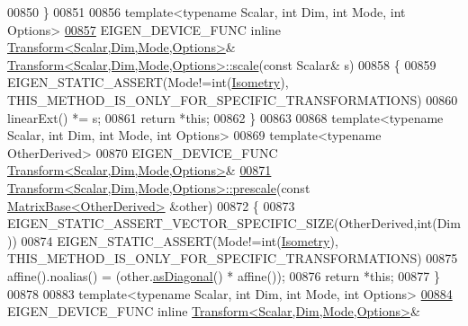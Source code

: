 \begin{DoxyCode}
00850 \}
00851 
00856 \textcolor{keyword}{template}<\textcolor{keyword}{typename} Scalar, \textcolor{keywordtype}{int} Dim, \textcolor{keywordtype}{int} Mode, \textcolor{keywordtype}{int} Options>
\hyperlink{group___geometry___module_a7c4f178cd06d8352607a79804e23d275}{00857} EIGEN\_DEVICE\_FUNC \textcolor{keyword}{inline} \hyperlink{group___geometry___module_class_eigen_1_1_transform}{Transform<Scalar,Dim,Mode,Options>}& 
      \hyperlink{group___geometry___module_class_eigen_1_1_transform}{Transform<Scalar,Dim,Mode,Options>::scale}(\textcolor{keyword}{const} Scalar& s)
00858 \{
00859   EIGEN\_STATIC\_ASSERT(Mode!=\textcolor{keywordtype}{int}(\hyperlink{group__enums_ggaee59a86102f150923b0cac6d4ff05107a080cd5366173608f701cd945c2335568}{Isometry}), THIS\_METHOD\_IS\_ONLY\_FOR\_SPECIFIC\_TRANSFORMATIONS)
00860   linearExt() *= s;
00861   \textcolor{keywordflow}{return} *\textcolor{keyword}{this};
00862 \}
00863 
00868 \textcolor{keyword}{template}<\textcolor{keyword}{typename} Scalar, \textcolor{keywordtype}{int} Dim, \textcolor{keywordtype}{int} Mode, \textcolor{keywordtype}{int} Options>
00869 \textcolor{keyword}{template}<\textcolor{keyword}{typename} OtherDerived>
00870 EIGEN\_DEVICE\_FUNC \hyperlink{group___geometry___module_class_eigen_1_1_transform}{Transform<Scalar,Dim,Mode,Options>}&
\hyperlink{group___geometry___module_a7f60172a9a629614cdd60922cd818bac}{00871} \hyperlink{group___geometry___module_class_eigen_1_1_transform}{Transform<Scalar,Dim,Mode,Options>::prescale}(\textcolor{keyword}{const} 
      \hyperlink{group___core___module_class_eigen_1_1_matrix_base}{MatrixBase<OtherDerived>} &other)
00872 \{
00873   EIGEN\_STATIC\_ASSERT\_VECTOR\_SPECIFIC\_SIZE(OtherDerived,\textcolor{keywordtype}{int}(Dim))
00874   EIGEN\_STATIC\_ASSERT(Mode!=\textcolor{keywordtype}{int}(\hyperlink{group__enums_ggaee59a86102f150923b0cac6d4ff05107a080cd5366173608f701cd945c2335568}{Isometry}), THIS\_METHOD\_IS\_ONLY\_FOR\_SPECIFIC\_TRANSFORMATIONS)
00875   affine().noalias() = (other.\hyperlink{group___core___module_a14235b62c90f93fe910070b4743782d0}{asDiagonal}() * affine());
00876   \textcolor{keywordflow}{return} *\textcolor{keyword}{this};
00877 \}
00878 
00883 \textcolor{keyword}{template}<\textcolor{keyword}{typename} Scalar, \textcolor{keywordtype}{int} Dim, \textcolor{keywordtype}{int} Mode, \textcolor{keywordtype}{int} Options>
\hyperlink{group___geometry___module_adcf0b66220d062523c0e3bc0f99a28b1}{00884} EIGEN\_DEVICE\_FUNC \textcolor{keyword}{inline} \hyperlink{group___geometry___module_class_eigen_1_1_transform}{Transform<Scalar,Dim,Mode,Options>}& 

\end{DoxyCode}
